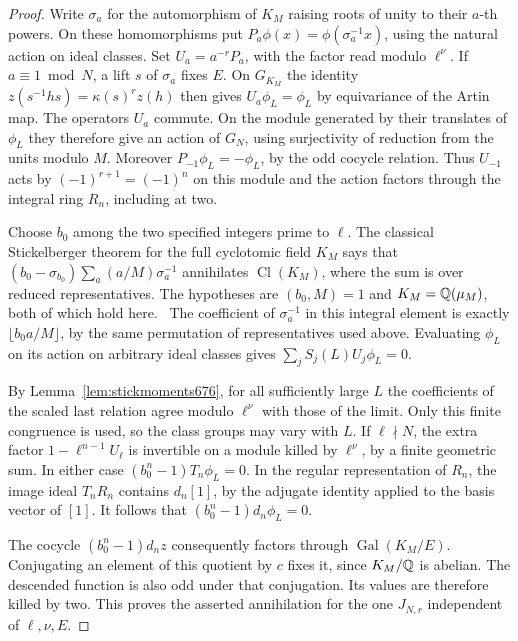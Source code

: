\documentclass[a4paper,11pt]{article}
\theoremstyle{definition}
\theoremstyle{remark}
\numberwithin{equation}{section}
\newcommand{\Cl}{\operatorname{Cl}}
\begin{document}
\begin{proof}
Write \(\sigma_a\) for the automorphism of \(K_M\) raising
roots of unity to their \(a\)-th powers. On these homomorphisms
put \(P_a\phi(x)=\phi(\sigma_a^{-1}x)\), using the natural
action on ideal classes. Set \(U_a=a^{-r}P_a\), with the
factor read modulo \(\ell^\nu\). If \(a\equiv1\bmod N\),
a lift \(s\) of \(\sigma_a\) fixes \(E\). On \(G_{K_M}\) the
identity \(z(s^{-1}hs)=\kappa(s)^r z(h)\) then gives
\(U_a\phi_L=\phi_L\) by equivariance of the Artin map. The
operators \(U_a\) commute. On the module generated by their
translates of \(\phi_L\) they therefore give an action of
\(G_N\), using surjectivity of reduction from the units
modulo \(M\). Moreover \(P_{-1}\phi_L=-\phi_L\), by the
odd cocycle relation. Thus \(U_{-1}\) acts by
\((-1)^{r+1}=(-1)^n\) on this module and the action factors
through the integral ring \(R_n\), including at two.

Choose \(b_0\) among the two specified integers prime to
\(\ell\). The classical Stickelberger theorem for the full
cyclotomic field \(K_M\) says that
\((b_0-\sigma_{b_0})\sum_a(a/M)\sigma_a^{-1}\) annihilates
\(\Cl(K_M)\), where the sum is over reduced representatives.
The hypotheses are \((b_0,M)=1\) and \(K_M=\mathbb Q(\mu_M)\), both
of which hold here.~\cite[Ch.~6]{II-II-V-stick}
The coefficient of \(\sigma_a^{-1}\) in this integral element
is exactly \(\lfloor b_0a/M\rfloor\), by the same permutation
of representatives used above. Evaluating \(\phi_L\) on its
action on arbitrary ideal classes gives
\(\sum_j S_j(L)U_j\phi_L=0\).

By Lemma~\ref{lem:stickmoments676}, for all sufficiently large
\(L\) the coefficients of the scaled last relation agree modulo
\(\ell^\nu\) with those of the limit. Only this finite
congruence is used, so the class groups may vary with \(L\).
If \(\ell\nmid N\), the extra factor \(1-\ell^{n-1}U_\ell\)
is invertible on a module killed by \(\ell^\nu\), by a finite
geometric sum. In either case
\((b_0^n-1)T_n\phi_L=0\). In the regular representation of
\(R_n\), the image ideal \(T_nR_n\) contains \(d_n[1]\), by
the adjugate identity applied to the basis vector of \([1]\).
It follows that \((b_0^n-1)d_n\phi_L=0\).

The cocycle \((b_0^n-1)d_n z\) consequently factors through
\(\operatorname{Gal}(K_M/E)\). Conjugating an element of this
quotient by \(c\) fixes it, since \(K_M/\mathbb Q\) is abelian. The
descended function is also odd under that conjugation. Its
values are therefore killed by two. This proves the asserted
annihilation for the one \(J_{N,r}\) independent of \(\ell,\nu,E\).
\end{proof}
\clearpage
\end{document}
